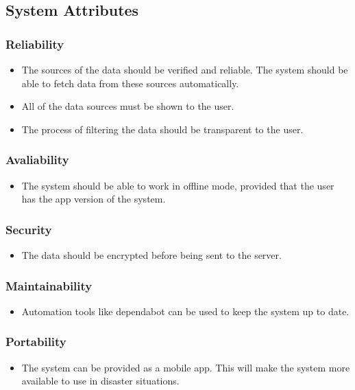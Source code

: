 \documentclass[a4paper]{article}
\begin{document}
        \subsection{System Attributes}

        \subsubsection{Reliability}
            \begin{itemize}
                \item The sources of the data should be verified and reliable. The system should be able to fetch data from these sources automatically.
                \item All of the data sources must be shown to the user.
                \item The process of filtering the data should be transparent to the user.
            \end{itemize}

            \subsubsection{Avaliability}
            \begin{itemize}
                \item The system should be able to work in offline mode, provided that the user has the app version of the system.
            \end{itemize}
            
            \subsubsection{Security}
            \begin{itemize}
                \item The data should be encrypted before being sent to the server.
            \end{itemize}

            \subsubsection{Maintainability}
            \begin{itemize}
                \item Automation tools like dependabot can be used to keep the system up to date.
            \end{itemize}

            \subsubsection{Portability}
            \begin{itemize}
                \item The system can be provided as a mobile app. This will make the system more available to use in disaster situations.
            \end{itemize}
\end{document}
